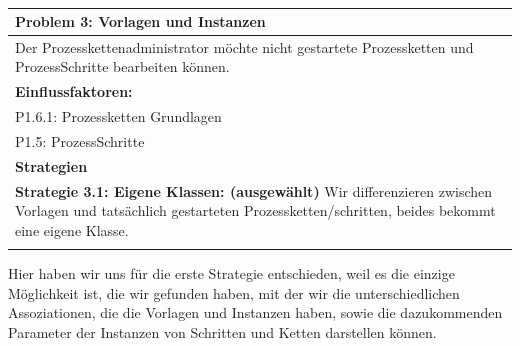 \documentclass[enabledeprecatedfontcommands,fontsize=12pt,paper=a4,twoside]{scrartcl}
\begin{document}
\begin{table}[H]
    \centering
    \begin{tabular}{|p{15cm}|}
    \hline
          \textbf{Problem 3:} Vorlagen und Instanzen \\ \hline
         Der Prozesskettenadministrator möchte nicht gestartete Prozessketten und ProzessSchritte bearbeiten können.
          \\ \hline
          \textbf{Einflussfaktoren: } \\
          P1.6.1: Prozessketten Grundlagen\\ 
	P1.5: ProzessSchritte \\
          \hline
          \textbf{Strategien} \\ \hline
            {}          
           \label{strategie:3.1}     
           \textbf{Strategie 3.1: Eigene Klassen: (ausgewählt)} Wir differenzieren zwischen Vorlagen und tatsächlich gestarteten Prozessketten/schritten, beides bekommt eine eigene Klasse. \\
          \\ \hline
    \end{tabular}
    \caption{}
    \label{tab:ProblemKarte3}

\end{table}
Hier haben wir uns für die erste Strategie entschieden, weil es die einzige Möglichkeit ist, die wir gefunden haben, mit der wir die unterschiedlichen Assoziationen, die die Vorlagen und Instanzen haben, sowie die dazukommenden Parameter der Instanzen von Schritten und Ketten darstellen können.  \\
\end{document}
